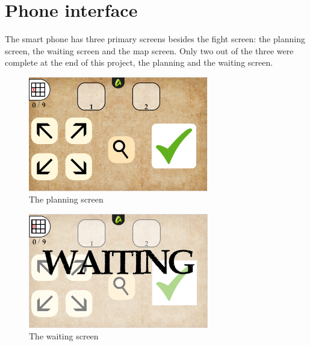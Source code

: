 
\section{Phone interface}
The smart phone has three primary screens besides the fight screen: the planning screen, the waiting screen and the map screen. Only two out of the three were complete at the end of this project, the planning and the waiting screen. 

\begin{figure}[h!]
	\centering
	\includegraphics[width=0.7\textwidth]{figures/planningScreen.png}
	\caption{The planning screen}
	\label{fig:plan}
\end{figure}


\begin{figure}[h!]
	\centering
	\includegraphics[width=0.7\textwidth]{figures/waitingScreen.png}
	\caption{The waiting screen}
	\label{fig:wait}
\end{figure}